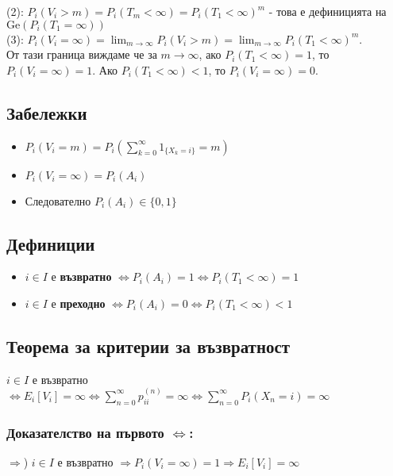 \documentclass{article}
\begin{document}
(2): $P_i(V_i > m) = P_i(T_m < \infty) = P_i(T_1 < \infty)^m$ - това е дефиницията на $\mathrm{Ge}(P_i(T_1 = \infty))$ \\

(3): $P_i(V_i = \infty) = \lim_{m \to \infty} P_i(V_i > m) = \lim_{m \to \infty} P_i(T_1 < \infty)^m$. \\
От тази граница виждаме че за $m \to \infty$, ако $P_i(T_1 < \infty) = 1$, то $P_i(V_i = \infty) = 1$. Ако $P_i(T_1 < \infty) < 1$, то $P_i(V_i = \infty) = 0$.

\subsection{Забележки}
\begin{itemize}
\item $P_i(V_i = m) = P_i\left(\sum_{k=0}^\infty 1_{\{X_k = i\}} = m\right)$
\item $P_i(V_i = \infty) = P_i(A_i)$
\item Следователно $P_i(A_i) \in \{0,1\}$
\end{itemize}

\subsection{Дефиниции}
\begin{itemize}
\item $i \in I$ е \textbf{възвратно} $\Leftrightarrow P_i(A_i) = 1 \Leftrightarrow P_i(T_1 < \infty) = 1$
\item $i \in I$ е \textbf{преходно} $\Leftrightarrow P_i(A_i) = 0 \Leftrightarrow P_i(T_1 < \infty) < 1$
\end{itemize}

\subsection{Теорема за критерии за възвратност}
$i \in I$ е възвратно $\Leftrightarrow E_i[V_i] = \infty \Leftrightarrow \sum_{n=0}^\infty p_{ii}^{(n)} = \infty \Leftrightarrow \sum_{n=0}^\infty P_i(X_n = i) = \infty$

\subsubsection*{Доказателство на първото $\Leftrightarrow$:}
$\Rightarrow$) $i \in I$ е възвратно $\Rightarrow P_i(V_i = \infty) = 1 \Rightarrow E_i[V_i] = \infty$ \\
\end{document}
